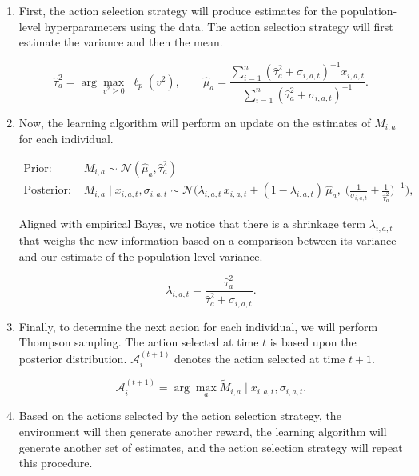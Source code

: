 \documentclass[letterpaper, 11pt]{extarticle}
\begin{document}
\begin{enumerate}
    \item First, the action selection strategy will produce estimates for the population-level hyperparameters using the data. The action selection strategy will first estimate the variance and then the mean. 

    \[
    \hat{\tau}_a^{2} 
    = 
    \arg\max_{v^{2} \ge 0} \; \ell_{p}(v^{2}),
    \qquad
    \hat{\mu}_a
    =
    \frac{
        \displaystyle\sum_{i=1}^{n}
        \left( \hat{\tau}_a^{2} + \sigma_{i,a,t} \right)^{-1}
        x_{i,a,t}
    }{
        \displaystyle\sum_{i=1}^{n}
        \left( \hat{\tau}_a^{2} + \sigma_{i,a,t} \right)^{-1}
    }.
    \]

    \item Now, the learning algorithm will perform an update on the estimates of $M_{i,a}$ for each individual. 

    \begin{align*}
    \text{Prior: } 
    &M_{i,a} \sim \mathcal{N}(\hat{\mu}_a, \hat{\tau}_a^{2})\\
    \text{Posterior: } 
    &M_{i,a} \mid x_{i,a,t}, \sigma_{i,a,t}
    \sim
    \mathcal{N}\!\Bigg(
        \lambda_{i,a,t} \, x_{i,a,t}
        + (1 - \lambda_{i,a,t}) \, \hat{\mu}_a,
        \;
        \Bigg(
            \frac{1}{\sigma_{i,a,t}}
            +
            \frac{1}{\hat{\tau}_a^{2}}
        \Bigg)^{-1}
    \Bigg),
    \end{align*}

    Aligned with empirical Bayes, we notice that there is a shrinkage term $\lambda_{i,a,t}$ that weighs the new information based on a comparison between its variance and our estimate of the population-level variance.

    \[
    \lambda_{i,a,t}
    =
    \frac{\hat{\tau}_a^{2}}
    {\hat{\tau}_a^{2} + \sigma_{i,a,t}}.
    \]

    \item Finally, to determine the next action for each individual, we will perform Thompson sampling. The action selected at time $t$ is based upon the posterior distribution. $\mathcal{A}_i^{(t+1)}$ denotes the action selected at time $t+1$.

    \[
        \mathcal{A}_i^{(t+1)}
        =
        \arg\max_{a} \tilde{M}_{i,a}  \mid x_{i,a,t},\sigma_{i,a,t}.
    \]

    \item Based on the actions selected by the action selection strategy, the environment will then generate another reward, the learning algorithm will generate another set of estimates, and the action selection strategy will repeat this procedure. 
\end{enumerate}
\end{document}
